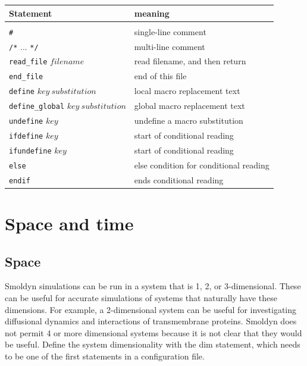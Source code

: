 \documentclass {scrbook}
\newcommand {\ttt} {\texttt}
\begin{document}
\begin{longtable}[c]{ll}
Statement & meaning\\
\hline\\
\ttt{\#} & single-line comment\\
\ttt{/*} ... \ttt{*/} & multi-line comment\\
\ttt{read\_file} $filename$ & read filename, and then return\\
\ttt{end\_file} & end of this file\\
\ttt{define} $key\ substitution$ & local macro replacement text\\
\ttt{define\_global} $key\ substitution$ & global macro replacement text\\
\ttt{undefine} $key$ & undefine a macro substitution\\
\ttt{ifdefine} $key$ & start of conditional reading\\
\ttt{ifundefine} $key$ & start of conditional reading\\
\ttt{else} & else condition for conditional reading\\
\ttt{endif} & ends conditional reading\\
\end{longtable}



\chapter{Space and time}

\section{Space}

Smoldyn simulations can be run in a system that is 1, 2, or 3-dimensional. These can be useful for accurate simulations of systems that naturally have these dimensions. For example, a 2-dimensional system can be useful for investigating diffusional dynamics and interactions of transmembrane proteins. Smoldyn does not permit 4 or more dimensional systems because it is not clear that they would be useful. Define the system dimensionality with the dim statement, which needs to be one of the first statements in a configuration file.
\end{document}
